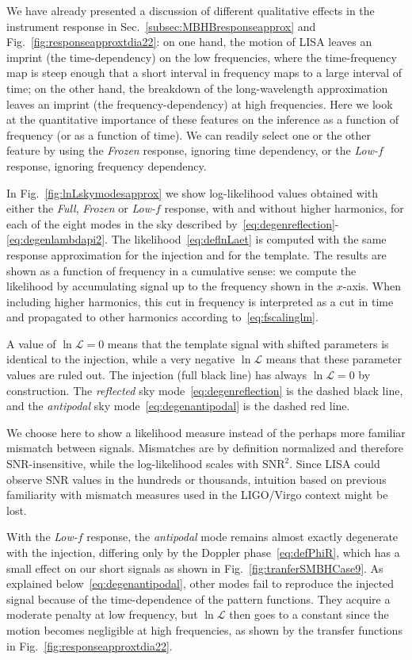 \documentclass[aps,showpacs,twocolumn,prd,superscriptaddress,nofootinbib]{revtex4-1}
\newcommand\calL{{\mathcal{L}}}
\begin{document}
We have already presented a discussion of different qualitative effects in the instrument response in Sec.~\ref{subsec:MBHBresponseapprox} and Fig.~\ref{fig:responseapproxtdia22}: on one hand, the motion of LISA leaves an imprint (the time-dependency) on the low frequencies, where the time-frequency map is steep enough that a short interval in frequency maps to a large interval of time; on the other hand, the breakdown of the long-wavelength approximation leaves an imprint (the frequency-dependency) at high frequencies. Here we look at the quantitative importance of these features on the inference as a function of frequency (or as a function of time). We can readily select one or the other feature by using the \textit{Frozen} response, ignoring time dependency, or the \textit{Low-$f$} response, ignoring frequency dependency.

In Fig.~\ref{fig:lnLskymodesapprox} we show log-likelihood values obtained with either the \textit{Full}, \textit{Frozen} or \textit{Low-$f$} response, with and without higher harmonics, for each of the eight modes in the sky described by~\eqref{eq:degenreflection}-\eqref{eq:degenlambdapi2}. The likelihood~\eqref{eq:deflnLaet} is computed with the same response approximation for the injection and for the template. The results are shown as a function of frequency in a cumulative sense: we compute the likelihood by accumulating signal up to the frequency shown in the $x$-axis. When including higher harmonics, this cut in frequency is interpreted as a cut in time and propagated to other harmonics according to~\eqref{eq:fscalinglm}.

A value of $\ln \calL = 0$ means that the template signal with shifted parameters is identical to the injection, while a very negative $\ln \calL$ means that these parameter values are ruled out. The injection (full black line) has always $\ln \calL = 0$ by construction. The \textit{reflected} sky mode~\eqref{eq:degenreflection} is the dashed black line, and the \textit{antipodal} sky mode~\eqref{eq:degenantipodal} is the dashed red line.

We choose here to show a likelihood measure instead of the perhaps more familiar mismatch between signals. Mismatches are by definition normalized and therefore SNR-insensitive, while the log-likelihood scales with $\mathrm{SNR}^{2}$. Since LISA could observe SNR values in the hundreds or thousands, intuition based on previous familiarity with mismatch measures used in the LIGO/Virgo context might be lost.

With the \textit{Low-$f$} response, the \textit{antipodal} mode remains almost exactly degenerate with the injection, differing only by the Doppler phase~\eqref{eq:defPhiR}, which has a small effect on our short signals as shown in Fig.~\ref{fig:tranferSMBHCase9}. As explained below~\eqref{eq:degenantipodal}, other modes fail to reproduce the injected signal because of the time-dependence of the pattern functions. They acquire a moderate penalty at low frequency, but $\ln \calL$ then goes to a constant since the motion becomes negligible at high frequencies, as shown by the transfer functions in Fig.~\ref{fig:responseapproxtdia22}.
\end{document}

